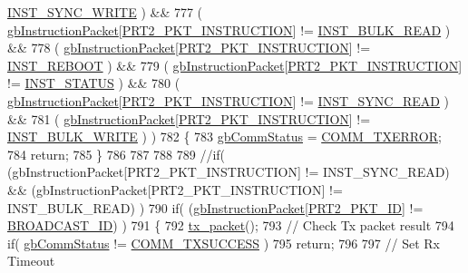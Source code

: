 \begin{DoxyCode}
      \hyperlink{dynamixel_8h_aeaa4b61ee11d45bd1a0cb932d7abaf77}{INST\_SYNC\_WRITE}   )  &&
777         ( \hyperlink{classdynamixel2_a298efe9115fdbf77019af1001e801fb4}{gbInstructionPacket}[\hyperlink{dynamixel_8h_aece9dd9d7c0fa1714d53c568865d79ad}{PRT2\_PKT\_INSTRUCTION}] != 
      \hyperlink{dynamixel_8h_a7967a17d10e9100ffb48ca542ba7587f}{INST\_BULK\_READ}    )  &&
778         ( \hyperlink{classdynamixel2_a298efe9115fdbf77019af1001e801fb4}{gbInstructionPacket}[\hyperlink{dynamixel_8h_aece9dd9d7c0fa1714d53c568865d79ad}{PRT2\_PKT\_INSTRUCTION}] != 
      \hyperlink{dynamixel_8h_aad0d63532602a783c0e4d6248496c555}{INST\_REBOOT}       )  &&
779         ( \hyperlink{classdynamixel2_a298efe9115fdbf77019af1001e801fb4}{gbInstructionPacket}[\hyperlink{dynamixel_8h_aece9dd9d7c0fa1714d53c568865d79ad}{PRT2\_PKT\_INSTRUCTION}] != 
      \hyperlink{dynamixel_8h_ad64f9506dd447c94c75405ecae867b87}{INST\_STATUS}       )  &&
780         ( \hyperlink{classdynamixel2_a298efe9115fdbf77019af1001e801fb4}{gbInstructionPacket}[\hyperlink{dynamixel_8h_aece9dd9d7c0fa1714d53c568865d79ad}{PRT2\_PKT\_INSTRUCTION}] != 
      \hyperlink{dynamixel_8h_a2c0994e6f77bcf585d7dfde88c10441f}{INST\_SYNC\_READ}    )  &&
781         ( \hyperlink{classdynamixel2_a298efe9115fdbf77019af1001e801fb4}{gbInstructionPacket}[\hyperlink{dynamixel_8h_aece9dd9d7c0fa1714d53c568865d79ad}{PRT2\_PKT\_INSTRUCTION}] != 
      \hyperlink{dynamixel_8h_a54f0a35d92b5238ca86cf770198cc1bf}{INST\_BULK\_WRITE}   ) )
782     \{
783         \hyperlink{classdynamixel2_a703e327ba8ec5909c238dc94a00cb32d}{gbCommStatus} = \hyperlink{dynamixel_8h_a1bd7c7b30db4f56dc80cef65ad38afff}{COMM\_TXERROR};
784         \textcolor{keywordflow}{return};
785     \}
786 
787     
788 
789     \textcolor{comment}{//if( (gbInstructionPacket[PRT2\_PKT\_INSTRUCTION] != INST\_SYNC\_READ) &&
       (gbInstructionPacket[PRT2\_PKT\_INSTRUCTION] != INST\_BULK\_READ) )}
790     \textcolor{keywordflow}{if}( (\hyperlink{classdynamixel2_a298efe9115fdbf77019af1001e801fb4}{gbInstructionPacket}[\hyperlink{dynamixel_8h_a3524b007f8f56ad0d80c1d0caf7e968a}{PRT2\_PKT\_ID}] != 
      \hyperlink{dynamixel_8h_ab9fe47395310b34fa1ceb112c9ca10e2}{BROADCAST\_ID}) )
791     \{
792         \hyperlink{classdynamixel2_a526e395e15fbf50ffbc8ce0853b08233}{tx\_packet}();
793         \textcolor{comment}{// Check Tx packet result}
794         \textcolor{keywordflow}{if}( \hyperlink{classdynamixel2_a703e327ba8ec5909c238dc94a00cb32d}{gbCommStatus} != \hyperlink{dynamixel_8h_aac6d30f996256b24d311de81eb0f0c1e}{COMM\_TXSUCCESS} )
795             \textcolor{keywordflow}{return};
796 
797         \textcolor{comment}{// Set Rx Timeout}

\end{DoxyCode}
